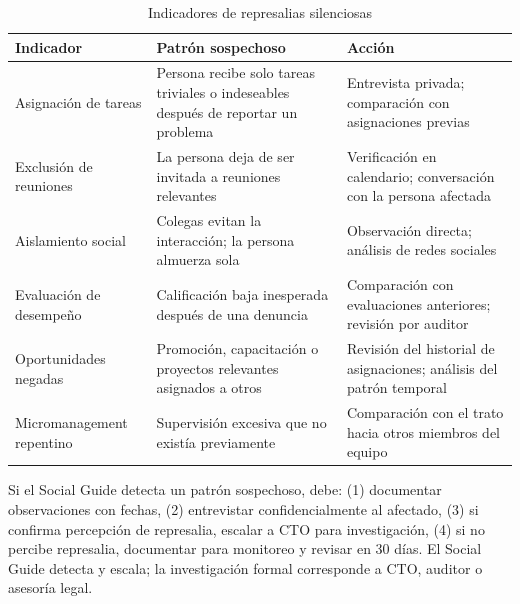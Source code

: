\begin{table}[h]
    \centering
    \small
    \begin{tabularx}{\textwidth}{|l|X|X|}
        \hline
        \textbf{Indicador} & \textbf{Patrón sospechoso}                                                         & \textbf{Acción} \\
        \hline
        Asignación de tareas
                           & Persona recibe solo tareas triviales o indeseables después de reportar un problema
                           & Entrevista privada; comparación con asignaciones previas                                             \\
        \hline
        Exclusión de reuniones
                           & La persona deja de ser invitada a reuniones relevantes
                           & Verificación en calendario; conversación con la persona afectada                                     \\
        \hline
        Aislamiento social
                           & Colegas evitan la interacción; la persona almuerza sola
                           & Observación directa; análisis de redes sociales                                                      \\
        \hline
        Evaluación de desempeño
                           & Calificación baja inesperada después de una denuncia
                           & Comparación con evaluaciones anteriores; revisión por auditor                                        \\
        \hline
        Oportunidades negadas
                           & Promoción, capacitación o proyectos relevantes asignados a otros
                           & Revisión del historial de asignaciones; análisis del patrón temporal                                 \\
        \hline
        Micromanagement repentino
                           & Supervisión excesiva que no existía previamente
                           & Comparación con el trato hacia otros miembros del equipo                                             \\
        \hline
    \end{tabularx}
    \caption{Indicadores de represalias silenciosas}
    \label{tab:represalias-silenciosas}
\end{table}
\FloatBarrier

Si el Social Guide detecta un patrón sospechoso, debe: (1) documentar observaciones con fechas, (2) entrevistar confidencialmente al afectado, (3) si confirma percepción de represalia, escalar a CTO para investigación, (4) si no percibe represalia, documentar para monitoreo y revisar en 30 días. El Social Guide detecta y escala; la investigación formal corresponde a CTO, auditor o asesoría legal.


